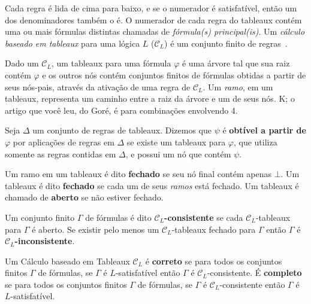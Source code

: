 Cada regra é lida de cima para baixo, e se o numerador é satisfatível,
então um dos denominadores também o é. O numerador de cada regra do
tableaux contém uma ou mais fórmulas distintas chamadas de \textit{fórmula(s)
principal(is)}. Um \textit{cálculo baseado em tableaux} para uma lógica $L$ ($\mathcal{C}_L$) 
é um conjunto finito de regras~\cite{clausal_tableaux}.

Dado um $\mathcal{C}_L$, um tableaux para uma fórmula $\varphi$ é uma árvore tal
que sua raiz contém $\varphi$ e os outros nós contém conjuntos finitos de
fórmulas obtidas a partir de seus nós-pais, através da ativação de uma regra de
$\mathcal{C}_L$. Um \textit{ramo}, em um tableaux, representa um caminho entre a
raiz da árvore e um de seus nós. %
K; o artigo que você leu, do Goré, é para combinações envolvendo 4.

\begin{definition}
Seja $\Delta$ um conjunto de regras de tableaux. Dizemos que $\psi$ é
\textbf{obtível a partir de} $\varphi$ por aplicações de regras em $\Delta$ se existe
um tableaux para $\varphi$, que utiliza somente as regras contidas em $\Delta$, e possui
um nó que contém $\psi$. 
\end{definition}

\begin{definition}
    Um ramo em um tableaux é dito \textbf{fechado} se seu nó final
    contém apenas $\bot$. Um tableaux é dito \textbf{fechado} se cada um de seus
    \textit{ramos} está fechado. Um tableaux é chamado de \textbf{aberto} se
    não estiver fechado.
\end{definition}

\begin{definition}
    Um conjunto finito $\Gamma$ de fórmulas é dito
    \textbf{$\mathcal{C}_L$-consistente} se cada $\mathcal{C}_L$-tableaux para $\Gamma$
    é aberto. Se existir pelo menos um $\mathcal{C}_L$-tableaux fechado para $\Gamma$
    então $\Gamma$ é \textbf{$\mathcal{C}_L$-inconsistente}.
\end{definition}

\begin{definition}
    Um Cálculo baseado em Tableaux $\mathcal{C}_L$ é \textbf{correto} se para todos os
    conjuntos finitos $\Gamma$ de fórmulas, se $\Gamma$ é $L$-satisfatível então $\Gamma$ é
    $\mathcal{C}_L$-consistente. É \textbf{completo} se para todos os conjuntos
    finitos $\Gamma$ de fórmulas, se $\Gamma$ é $\mathcal{C}_L$-consistente então $\Gamma$ é
    $L$-satisfatível.
\end{definition}

